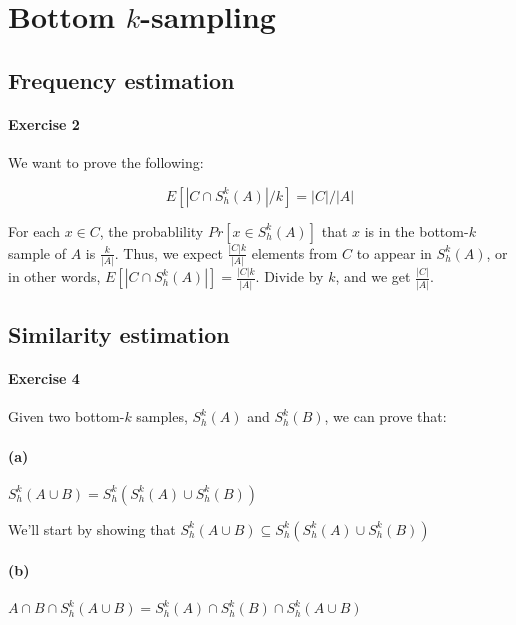 \section{Bottom $k$-sampling}

\subsection{Frequency estimation}

\paragraph{Exercise 2}
We want to prove the following:

\[
    E[|C \cap S^k_h(A)|/k] = |C|/|A|
\]

For each $x \in C$, the probablility $Pr[x \in S^k_h(A)]$ that $x$ is in the bottom-$k$ sample of $A$ is $\frac{k}{|A|}$. Thus, we expect $\frac{|C|k}{|A|}$ elements from $C$ to appear in $S^k_h(A)$, or in other words, $E[|C \cap S^k_h(A)|] = \frac{|C|k}{|A|}$. Divide by $k$, and we get $\frac{|C|}{|A|}$. 

\subsection{Similarity estimation}

\paragraph{Exercise 4}
Given two bottom-$k$ samples, $S^k_h(A)$ and $S^k_h(B)$, we can prove that:

\paragraph*{(a)}
$S^k_h(A \cup B) = S^k_h(S^k_h(A) \cup S^k_h(B))$

We'll start by showing that $S^k_h(A \cup B) \subseteq S^k_h(S^k_h(A) \cup S^k_h(B))$

\paragraph*{(b)}
$A \cap B \cap S^k_h(A \cup B) = S^k_h(A) \cap S^k_h(B) \cap S^k_h(A \cup B)$

